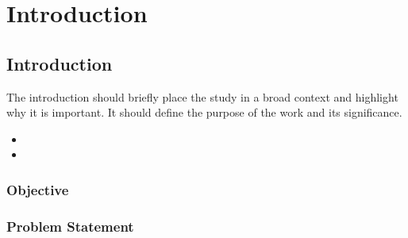 
\chapter{Introduction}\doublespacing %

\label{Chapter1} %


\section{Introduction}
The introduction should briefly place the study in a broad context and highlight why it is important. It should define the purpose of the work and its significance. 
\begin{itemize}
    \item 
    \item 

\end{itemize}
\subsection{Objective}

\subsection{Problem Statement}



